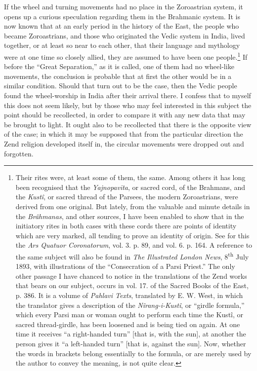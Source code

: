 \documentclass[a4paper, 11pt, oneside, polutonikogreek, english]{article}
\begin{document}
If the wheel and turning movements had no place in the Zoroastrian system, it opens up a curious speculation regarding them in the Brahmanic system. It is now known that at an early period in the history of the East, the people who became Zoroastrians, and those who originated the Vedic system in India, lived together, or at least so near to each other, that their language and mythology were at one time so closely allied, they are assumed to have been one people.\footnote{Their rites were, at least some of them, the same. Among others it has long been recognised that the \emph{Yajnopavīta}, or sacred cord, of the Brahmans, and the \emph{Kustî}, or sacred thread of the Parsees, the modern Zoroastrians, were derived from one original. But lately, from the valuable and minute details in the \emph{Brâhmanas}, and other sources, I have been enabled to show that in the initiatory rites in both cases with these cords there are points of identity which are very marked, all tending to prove an identity of origin. See for this the \emph{Ars Quatuor Coronatorum}, vol. 3. p. 89, and vol. 6. p. 164. A reference to the same subject will also be found in \emph{The Illustrated London News}, 8\textsuperscript{th} July 1893, with illustrations of the ``Consecration of a Parsi Priest.'' The only other passage I have chanced to notice in the translations of the Zend works that bears on our subject, occurs in vol. 17. of the Sacred Books of the East, p. 386. It is a volume of \emph{Pahlavi Texts}, translated by E. W. West, in which the translator gives a description of the \emph{Nîrang-i-Kustî}, or ``girdle formula,'' which every Parsi man or woman ought to perform each time the Kustî, or sacred thread-girdle, has been loosened and is being tied on again. At one time it receives ``a right-handed turn'' [that is, with the sun], at another the person gives it ``a left-handed turn'' [that is, against the sun]. Now, whether the words in brackets belong essentially to the formula, or are merely used by the author to convey the meaning, is not quite clear.} If before the ``Great Separation,'' as it is called, one of them had no wheel-like movements, the conclusion is probable that at first the other would be in a similar condition. Should that turn out to be the case, then the Vedic people found the wheel-worship in India after their arrival there. I confess that to myself this does not seem likely, but by those who may feel interested in this subject the point should be recollected, in order to compare it with any new data that may be brought to light. It ought also to be recollected that there is the opposite view of the case; in which it may be supposed that from the particular direction the Zend religion developed itself in, the circular movements were dropped out and forgotten.
\end{document}

